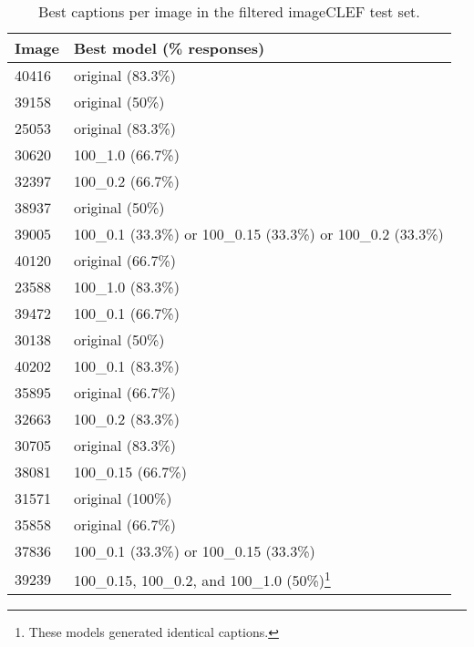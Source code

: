 \documentclass[11pt]{article}
\begin{document}
\begin{table}[h]
\begin{center}
\begin{tabular}{|p{1cm}|p{4.5cm}|}
\hline \bf Image & \bf Best model (\% responses) \\ \hline
40416 & original (83.3\%)  \\
39158 & original (50\%)  \\
25053 & original (83.3\%)  \\
30620 & 100\_1.0 (66.7\%)  \\
32397 & 100\_0.2 (66.7\%) \\
38937 & original (50\%) \\
39005 & 100\_0.1 (33.3\%) or 100\_0.15 (33.3\%) or 100\_0.2 (33.3\%) \\
40120 & original (66.7\%) \\
23588 & 100\_1.0 (83.3\%)  \\
39472 & 100\_0.1 (66.7\%)  \\
30138 & original (50\%)  \\
40202 & 100\_0.1 (83.3\%)  \\
35895 & original (66.7\%)  \\
32663 & 100\_0.2 (83.3\%)   \\
30705 & original (83.3\%) \\
38081 & 100\_0.15 (66.7\%) \\
31571 & original (100\%) \\
35858 & original (66.7\%) \\
37836 & 100\_0.1 (33.3\%) or 100\_0.15 (33.3\%) \\
39239 & 100\_0.15, 100\_0.2, and 100\_1.0 (50\%)\footnote{These models generated identical captions.} \\
\hline
\end{tabular}
\end{center}
\caption{\label{filtered-table} Best captions per image in the filtered imageCLEF test set. }
\end{table}
\end{document}
